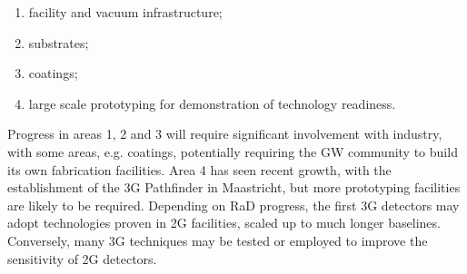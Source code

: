 \begin{enumerate}
\item facility and vacuum infrastructure; 
\item substrates; 
\item coatings; 
\item large scale prototyping for demonstration of technology readiness. 
\end{enumerate}

\noindent Progress in areas 1, 2 and 3 will require significant involvement with industry, with some areas, e.g. coatings,  potentially requiring the \ac{GW} community to build its own fabrication facilities. Area 4 has seen recent growth, with the establishment of the 3G Pathfinder in Maastricht, but more prototyping facilities are likely to be required. Depending on \ac{RaD} progress, the first \ac{3G} detectors may adopt technologies proven in \ac{2G} facilities, scaled up to much longer baselines. Conversely, many \ac{3G} techniques may be tested or employed to improve the sensitivity of \ac{2G} detectors. 

